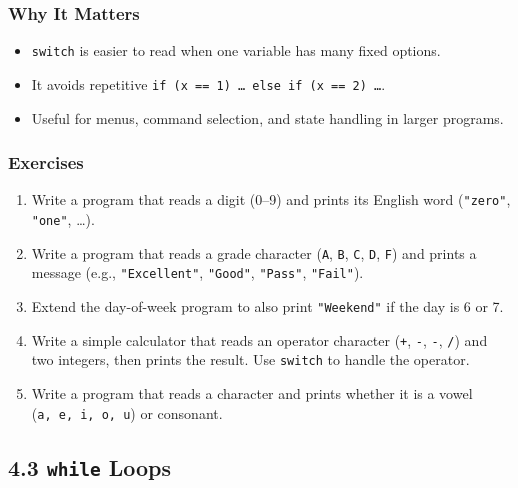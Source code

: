 \documentclass[
  letterpaper,
  DIV=11,
  numbers=noendperiod]{scrreprt}
\providecommand{\tightlist}{%
  \setlength{\itemsep}{0pt}\setlength{\parskip}{0pt}}
\begin{document}
\subsubsection{Why It Matters}\label{why-it-matters-15}

\begin{itemize}
\tightlist
\item
  \texttt{switch} is easier to read when one variable has many fixed
  options.
\item
  It avoids repetitive
  \texttt{if\ (x\ ==\ 1)\ …\ else\ if\ (x\ ==\ 2)\ …}.
\item
  Useful for menus, command selection, and state handling in larger
  programs.
\end{itemize}

\subsubsection{Exercises}\label{exercises-16}

\begin{enumerate}
\def\labelenumi{\arabic{enumi}.}
\tightlist
\item
  Write a program that reads a digit (0--9) and prints its English word
  (\texttt{"zero"}, \texttt{"one"}, \ldots).
\item
  Write a program that reads a grade character
  (\texttt{\textquotesingle{}A\textquotesingle{}},
  \texttt{\textquotesingle{}B\textquotesingle{}},
  \texttt{\textquotesingle{}C\textquotesingle{}},
  \texttt{\textquotesingle{}D\textquotesingle{}},
  \texttt{\textquotesingle{}F\textquotesingle{}}) and prints a message
  (e.g., \texttt{"Excellent"}, \texttt{"Good"}, \texttt{"Pass"},
  \texttt{"Fail"}).
\item
  Extend the day-of-week program to also print \texttt{"Weekend"} if the
  day is 6 or 7.
\item
  Write a simple calculator that reads an operator character
  (\texttt{+}, \texttt{-}, \texttt{-}, \texttt{/}) and two integers,
  then prints the result. Use \texttt{switch} to handle the operator.
\item
  Write a program that reads a character and prints whether it is a
  vowel (\texttt{a,\ e,\ i,\ o,\ u}) or consonant.
\end{enumerate}

\subsection{\texorpdfstring{4.3 \texttt{while}
Loops}{4.3 while Loops}}\label{while-loops}
\end{document}
